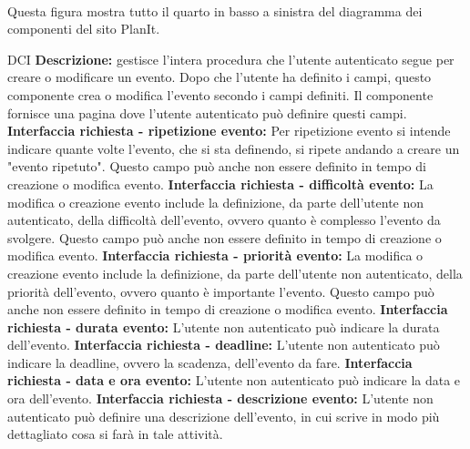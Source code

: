 \begin{center}
    \\
    Questa figura mostra tutto il quarto in basso a sinistra del diagramma dei componenti del sito PlanIt.
\end{center}
\newpage
\begin{listaPersonale}{DCI}
    \textbf{Descrizione:} gestisce l'intera procedura che l'utente autenticato segue per creare o modificare un evento. Dopo che l'utente ha definito i campi, questo componente crea o modifica l'evento secondo i campi definiti.  Il componente fornisce una pagina dove l'utente autenticato può definire questi campi.
    \textbf{Interfaccia richiesta - ripetizione evento:} Per ripetizione evento si intende indicare quante volte l'evento, che si sta definendo, si ripete andando a creare un "evento ripetuto". Questo campo può anche non essere definito in tempo di creazione o modifica evento.
    \textbf{Interfaccia richiesta - difficoltà evento:} La modifica o creazione evento include la definizione, da parte dell'utente non autenticato, della difficoltà dell'evento, ovvero quanto è complesso l'evento da svolgere. Questo campo può anche non essere definito in tempo di creazione o modifica evento.
    \textbf{Interfaccia richiesta - priorità evento:} La modifica o creazione evento include la definizione, da parte dell'utente non autenticato, della priorità dell'evento, ovvero quanto è importante l'evento. Questo campo può anche non essere definito in tempo di creazione o modifica evento.
    \textbf{Interfaccia richiesta - durata evento:} L'utente non autenticato può indicare la durata dell'evento.
    \textbf{Interfaccia richiesta - deadline:} L'utente non autenticato può indicare la deadline, ovvero la scadenza, dell'evento da fare.
    \textbf{Interfaccia richiesta - data e ora evento:} L'utente non autenticato può indicare la data e ora dell'evento.
    \textbf{Interfaccia richiesta - descrizione evento:} L'utente non autenticato può definire una descrizione dell'evento, in cui scrive in modo più dettagliato cosa si farà in tale attività.

\end{listaPersonale}
